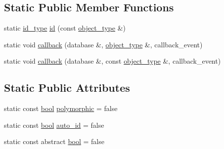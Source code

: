 \subsection*{Static Public Member Functions}
\begin{DoxyCompactItemize}
\item 
static \hyperlink{classodb_1_1access_1_1object__traits_3_01_1_1_object_class_01_4_ad099d55d95356877555ff87c5d99e370}{id\+\_\+type} \hyperlink{classodb_1_1access_1_1object__traits_3_01_1_1_object_class_01_4_ac529bc5d4a4b52aa5193a55a131ec639}{id} (const \hyperlink{classodb_1_1access_1_1object__traits_3_01_1_1_object_class_01_4_ace038dbac6a8699ff387d2de36db3f85}{object\+\_\+type} \&)
\item 
static void \hyperlink{classodb_1_1access_1_1object__traits_3_01_1_1_object_class_01_4_a12ec0a7efc7638f1f0695531769f0b7c}{callback} (database \&, \hyperlink{classodb_1_1access_1_1object__traits_3_01_1_1_object_class_01_4_ace038dbac6a8699ff387d2de36db3f85}{object\+\_\+type} \&, callback\+\_\+event)
\item 
static void \hyperlink{classodb_1_1access_1_1object__traits_3_01_1_1_object_class_01_4_a600e9b3bfede274be46ab40a301ae6e8}{callback} (database \&, const \hyperlink{classodb_1_1access_1_1object__traits_3_01_1_1_object_class_01_4_ace038dbac6a8699ff387d2de36db3f85}{object\+\_\+type} \&, callback\+\_\+event)
\end{DoxyCompactItemize}
\subsection*{Static Public Attributes}
\begin{DoxyCompactItemize}
\item 
static const \hyperlink{classodb_1_1access_1_1object__traits_3_01_1_1_object_class_01_4_a1f9680cb812834a08dfbf195bd41a057}{bool} \hyperlink{classodb_1_1access_1_1object__traits_3_01_1_1_object_class_01_4_abef923adc10f77aa212625b85325729f}{polymorphic} = false
\item 
static const \hyperlink{classodb_1_1access_1_1object__traits_3_01_1_1_object_class_01_4_a1f9680cb812834a08dfbf195bd41a057}{bool} \hyperlink{classodb_1_1access_1_1object__traits_3_01_1_1_object_class_01_4_aa39fbc10492ca1c8deb95695c5e31a49}{auto\+\_\+id} = false
\item 
static const abstract \hyperlink{classodb_1_1access_1_1object__traits_3_01_1_1_object_class_01_4_a1f9680cb812834a08dfbf195bd41a057}{bool} = false
\end{DoxyCompactItemize}


